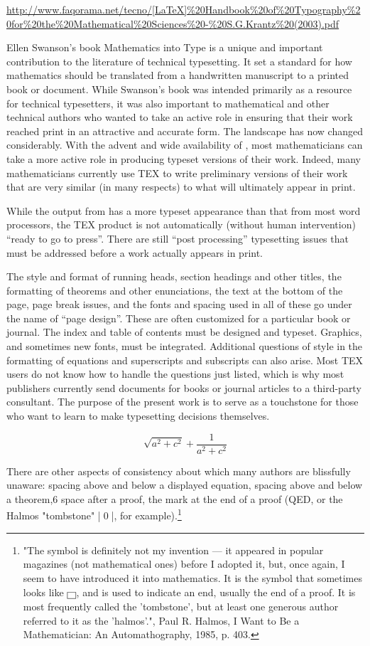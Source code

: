 {\url{http://www.faqorama.net/tecno/[LaTeX]%20Handbook%20of%20Typography%20for%20the%20Mathematical%20Sciences%20-%20S.G.Krantz%20(2003).pdf}


Ellen Swanson’s book Mathematics into Type is a unique and important contribution to the literature of technical typesetting. It set a
standard for how mathematics should be translated from a handwritten
manuscript to a printed book or document. While Swanson’s book was
intended primarily as a resource for technical typesetters, it was also important to mathematical and other technical authors who wanted to take
an active role in ensuring that their work reached print in an attractive
and accurate form.
The landscape has now changed considerably. With the advent and
wide availability of \tex,
most mathematicians can take a more active
role in producing typeset versions of their work. Indeed, many mathematicians currently use TEX to write preliminary versions of their work
that are very similar (in many respects) to what will ultimately appear
in print.

While the output from \tex has a more typeset appearance than that
from most word processors, the TEX product is not automatically (without human intervention) \enquote{ready to go to press}. There are still \enquote{post processing} typesetting issues that must be addressed before a work
actually appears in print. 

The style and format of running heads, section headings and other titles, the formatting of theorems and other
enunciations, the text at the bottom of the page, page break issues, and
the fonts and spacing used in all of these go under the name of “page design”. These are often customized for a particular book or journal. The
index and table of contents must be designed and typeset. Graphics,
and sometimes new fonts, must be integrated. Additional questions of
style in the formatting of equations and superscripts and subscripts can
also arise. Most TEX users do not know how to handle the questions just
listed, which is why most publishers currently send \tex documents for
books or journal articles to a third-party \tex consultant. The purpose
of the present work is to serve as a touchstone for those who want to
learn to make typesetting decisions themselves.


\def\smsqr#1#2{\sqrt{{#1}^2 + {#2}^2} + \frac{1}{{#1}^2 + {#2}^2}}

\[ \smsqr{a}{c} \]

There are other aspects of consistency about which many authors
are blissfully unaware: spacing above and below a displayed equation,
spacing above and below a theorem,6
space after a proof, the mark at
the end of a proof (QED, or the Halmos "tombstone" |\qed|, for example).\footnote{ "The symbol is definitely not my invention — it appeared in popular magazines (not mathematical ones) before I adopted it, but, once again, I seem to have introduced it into mathematics. It is the symbol that sometimes looks like \(\boxed{\thinspace}\), and is used to indicate an end, usually the end of a proof. It is most frequently called the 'tombstone', but at least one generous author referred to it as the 'halmos'.", Paul R. Halmos, I Want to Be a Mathematician: An Automathography, 1985, p. 403.}

}
